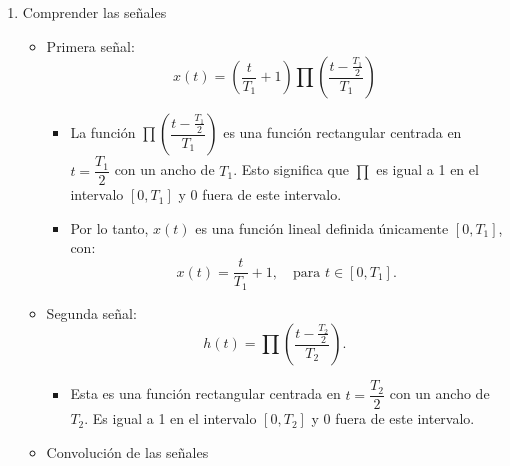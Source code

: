 \begin{enumerate}[label=\color{red}\textbf{\arabic*)}]
    \begin{enumerate}[label=Paso \arabic*:]
      \item Comprender las señales
        \begin{itemize}[label=\textbullet]
          \item Primera señal: \[
          x(t)=\left( \dfrac{t}{T_1}+1 \right) \prod\left( \dfrac{t-\frac{T_1}{2} }{T_1} \right)
          \] 
          \begin{itemize}[label=\textbullet]
            \item La función $\prod\left( \dfrac{t-\frac{T_1}{2} }{T_1} \right) $ es una función rectangular centrada en $t=\dfrac{T_1}{2}$ con un ancho de $T_1$. Esto significa que $\prod$ es igual a 1 en el intervalo  $[0,T_1]$ y 0 fuera de este intervalo.
            \item Por lo tanto, $x(t)$ es una función lineal definida únicamente $[0,T_1]$, con: \[
                x(t)=\dfrac{t}{T_1}+1,\quad\text{para }t\in [0,T_1].
            \] 
            \begin{center}
            \end{center}
          \end{itemize}
        \item Segunda señal: \[
        h(t)=\prod\left( \dfrac{t-\frac{T_2}{2} }{T_2} \right) .
        \] 
        \begin{itemize}[label=\textbullet]
          \item Esta es una función rectangular centrada en $t=\dfrac{T_2}{2}$ con un ancho de $T_2$. Es igual a 1 en el intervalo $[0,T_2]$ y 0 fuera de este intervalo.
            \begin{center}
            \end{center}
        \end{itemize}
      \item Convolución de las señales


\end{itemize}
\end{enumerate}
\end{enumerate}
